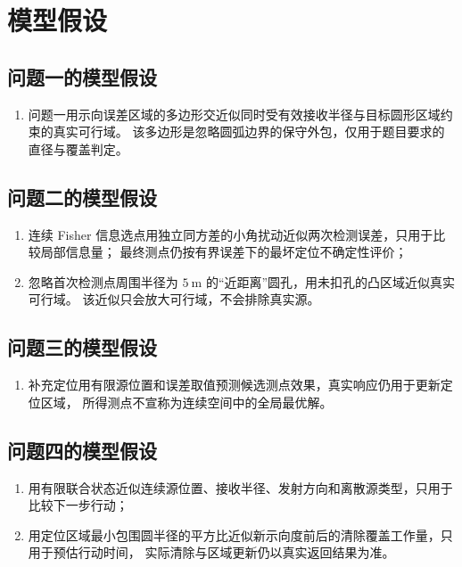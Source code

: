 \section{模型假设}

\subsection{问题一的模型假设}

\begin{enumerate}
  \item 问题一用示向误差区域的多边形交近似同时受有效接收半径与目标圆形区域约束的真实可行域。
  该多边形是忽略圆弧边界的保守外包，仅用于题目要求的直径与覆盖判定。
\end{enumerate}

\subsection{问题二的模型假设}

\begin{enumerate}
  \item 连续 Fisher 信息选点用独立同方差的小角扰动近似两次检测误差，只用于比较局部信息量；
  最终测点仍按有界误差下的最坏定位不确定性评价；
  \item 忽略首次检测点周围半径为 $5\ \mathrm{m}$ 的“近距离”圆孔，用未扣孔的凸区域近似真实可行域。
  该近似只会放大可行域，不会排除真实源。
\end{enumerate}

\subsection{问题三的模型假设}

\begin{enumerate}
  \item 补充定位用有限源位置和误差取值预测候选测点效果，真实响应仍用于更新定位区域，
  所得测点不宣称为连续空间中的全局最优解。
\end{enumerate}

\subsection{问题四的模型假设}

\begin{enumerate}
  \item 用有限联合状态近似连续源位置、接收半径、发射方向和离散源类型，只用于比较下一步行动；
  \item 用定位区域最小包围圆半径的平方比近似新示向度前后的清除覆盖工作量，只用于预估行动时间，
  实际清除与区域更新仍以真实返回结果为准。
\end{enumerate}

